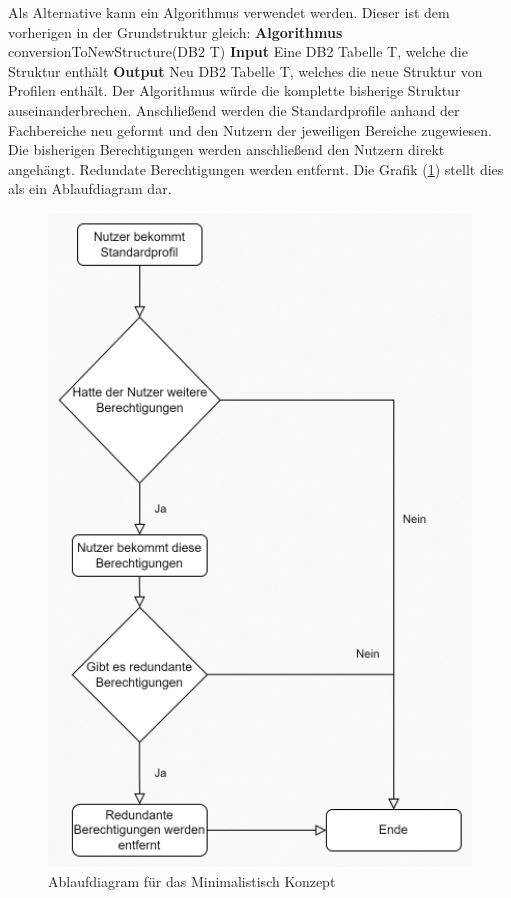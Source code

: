Als Alternative kann ein Algorithmus verwendet werden.
Dieser ist dem vorherigen in der Grundstruktur gleich:
\newline
\newline
\textbf{Algorithmus} conversionToNewStructure(DB$2$ T)
\newline
\newline
\textbf{Input} Eine DB2 Tabelle T, welche die Struktur enthält
\newline
\newline
\textbf{Output} Neu DB2 Tabelle T, welches die neue Struktur von Profilen enthält.
\newline
\newline
Der Algorithmus würde die komplette bisherige Struktur auseinanderbrechen.
Anschließend werden die Standardprofile anhand der Fachbereiche neu geformt und den Nutzern der jeweiligen Bereiche zugewiesen.
Die bisherigen Berechtigungen werden anschließend den Nutzern direkt angehängt.
Redundate Berechtigungen werden entfernt.
Die Grafik (\ref{fig:Mini}) stellt dies als ein Ablaufdiagram dar.
\begin{figure}[h!]
 \centering
 \includegraphics[width=1\textwidth]{gfx/Picture/Mini.PNG}
 \caption{Ablaufdiagram für das Minimalistisch Konzept}
 \label{fig:Mini}
\end{figure}